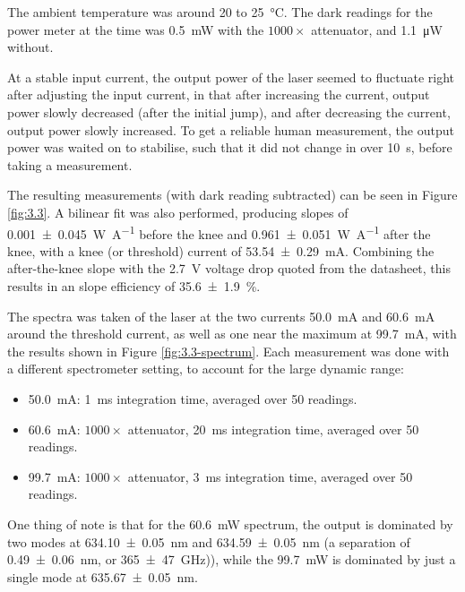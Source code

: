 \documentclass[a4paper]{scrartcl}
\begin{document}
The ambient temperature was around 20 to \SI{25}{\degreeCelsius}. The dark readings for the power meter at the time was \SI{0.5}{\milli\watt} with the \(1000 \times\) attenuator, and \SI{1.1}{\micro\watt} without.

At a stable input current, the output power of the laser seemed to fluctuate right after adjusting the input current, in that after increasing the current, output power slowly decreased (after the initial jump), and after decreasing the current, output power slowly increased. To get a reliable human measurement, the output power was waited on to stabilise, such that it did not change in over \SI{10}{\second}, before taking a measurement.

The resulting measurements (with dark reading subtracted) can be seen in Figure \ref{fig:3.3}. A bilinear fit was also performed, producing slopes of \SI{0.001 \pm 0.045}{\watt\per\ampere} before the knee and \SI{0.961 \pm 0.051}{\watt\per\ampere} after the knee, with a knee (or threshold) current of \SI{53.54 \pm 0.29}{\milli\ampere}. Combining the after-the-knee slope with the \SI{2.7}{\volt} voltage drop quoted from the datasheet, this results in an slope efficiency of \SI{35.6 \pm 1.9}{\percent}.

The spectra was taken of the laser at the two currents \SI{50.0}{\milli\ampere} and \SI{60.6}{\milli\ampere} around the threshold current, as well as one near the maximum at \SI{99.7}{\milli\ampere}, with the results shown in Figure \ref{fig:3.3-spectrum}. Each measurement was done with a different spectrometer setting, to account for the large dynamic range:
\begin{itemize}
    \item \SI{50.0}{\milli\ampere}: \SI{1}{\milli\second} integration time, averaged over 50 readings.
    \item \SI{60.6}{\milli\ampere}: \(1000 \times\) attenuator, \SI{20}{\milli\second} integration time, averaged over 50 readings.
    \item \SI{99.7}{\milli\ampere}: \(1000 \times\) attenuator, \SI{3}{\milli\second} integration time, averaged over 50 readings.
\end{itemize}

One thing of note is that for the \SI{60.6}{\milli\watt} spectrum, the output is dominated by two modes at \SI{634.10 \pm 0.05}{\nano\metre} and \SI{634.59 \pm 0.05}{\nano\metre} (a separation of \SI{0.49 \pm 0.06}{\nano\metre}, or \SI{365 \pm 47}{\giga\hertz})), while the \SI{99.7}{\milli\watt} is dominated by just a single mode at \SI{635.67 \pm 0.05}{\nano\metre}.
\end{document}
